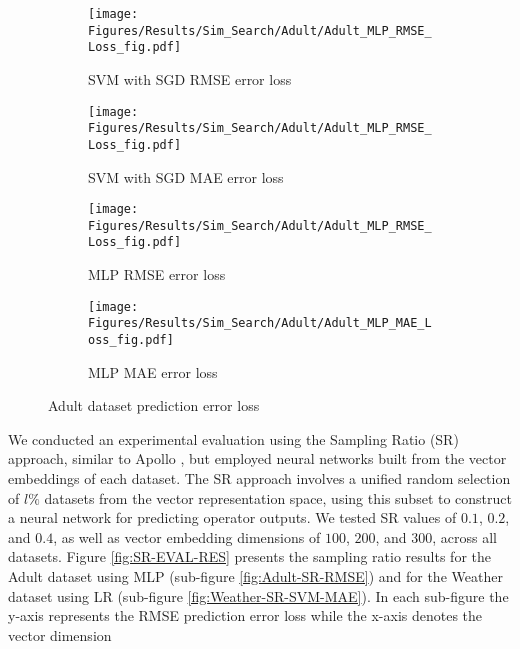 \begin{figure}[!t]
     \centering
     \begin{subfigure}[b]{0.24\textwidth}
         \centering
         \texttt{[image: Figures/Results/Sim\_Search/Adult/Adult\_MLP\_RMSE\_Loss\_fig.pdf]}
         \caption{SVM with SGD RMSE error loss}
         \label{fig:Adult-LR-RMSE}
     \end{subfigure}
     \hfill 
     \begin{subfigure}[b]{0.24\textwidth}
         \centering
         \texttt{[image: Figures/Results/Sim\_Search/Adult/Adult\_MLP\_RMSE\_Loss\_fig.pdf]}
         \caption{SVM with SGD MAE error loss}
         \label{fig:Adult-LR-MAE}
     \end{subfigure}
     
     \begin{subfigure}[b]{0.24\textwidth}
         \centering
         \texttt{[image: Figures/Results/Sim\_Search/Adult/Adult\_MLP\_RMSE\_Loss\_fig.pdf]}
         \caption{MLP RMSE error loss}
         \label{fig:Adult-MLP-RMSE}
     \end{subfigure}
     \hfill 
     \begin{subfigure}[b]{0.24\textwidth}
         \centering
         \texttt{[image: Figures/Results/Sim\_Search/Adult/Adult\_MLP\_MAE\_Loss\_fig.pdf]}
         \caption{MLP MAE error loss}
         \label{fig:Adult-MLP-MAE}
     \end{subfigure}
        \caption{Adult dataset prediction error loss}
        \label{fig:Adult-EVAL-RES}
\end{figure}





We conducted an experimental evaluation using the Sampling Ratio (SR) approach, similar to Apollo \cite{b7Apollo1}, but employed neural networks built from the vector embeddings of each dataset. The SR approach involves a unified random selection of $l\%$ datasets from the vector representation space, using this subset to construct a neural network for predicting operator outputs. We tested SR values of $0.1$, $0.2$, and $0.4$, as well as vector embedding dimensions of $100$, $200$, and $300$, across all datasets. 
Figure \ref{fig:SR-EVAL-RES} presents the sampling ratio results for the Adult dataset using MLP (sub-figure \ref{fig:Adult-SR-RMSE}) and for the Weather dataset using LR (sub-figure \ref{fig:Weather-SR-SVM-MAE}). In each sub-figure the y-axis represents the RMSE prediction error loss while the x-axis denotes the vector dimension



